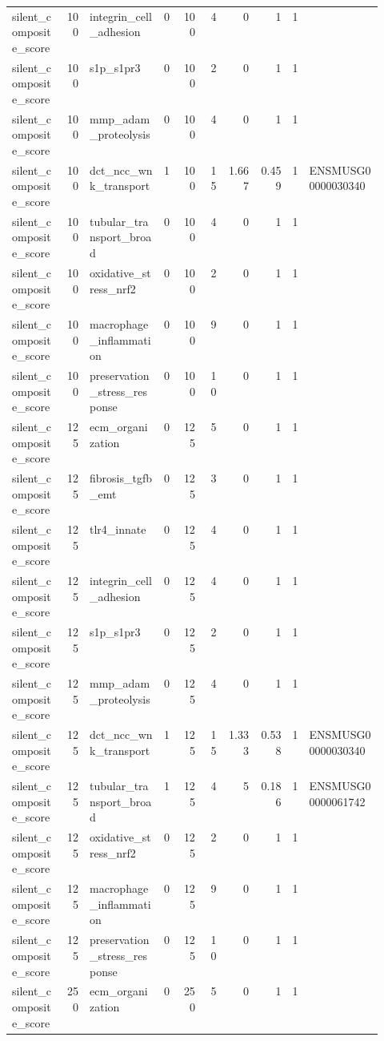 \documentclass[11pt]{article}
\begin{document}
\begin{landscape}
\begin{longtable}{p{0.14\linewidth}rp{0.20\linewidth}rrrrrrp{0.20\linewidth}}
silent\_composite\_score & 100 & integrin\_cell\_adhesion & 0 & 100 & 4 & 0 & 1 & 1 &  \\
silent\_composite\_score & 100 & s1p\_s1pr3 & 0 & 100 & 2 & 0 & 1 & 1 &  \\
silent\_composite\_score & 100 & mmp\_adam\_proteolysis & 0 & 100 & 4 & 0 & 1 & 1 &  \\
silent\_composite\_score & 100 & dct\_ncc\_wnk\_transport & 1 & 100 & 15 & 1.667 & 0.459 & 1 & ENSMUSG00000030340 \\
silent\_composite\_score & 100 & tubular\_transport\_broad & 0 & 100 & 4 & 0 & 1 & 1 &  \\
silent\_composite\_score & 100 & oxidative\_stress\_nrf2 & 0 & 100 & 2 & 0 & 1 & 1 &  \\
silent\_composite\_score & 100 & macrophage\_inflammation & 0 & 100 & 9 & 0 & 1 & 1 &  \\
silent\_composite\_score & 100 & preservation\_stress\_response & 0 & 100 & 10 & 0 & 1 & 1 &  \\
silent\_composite\_score & 125 & ecm\_organization & 0 & 125 & 5 & 0 & 1 & 1 &  \\
silent\_composite\_score & 125 & fibrosis\_tgfb\_emt & 0 & 125 & 3 & 0 & 1 & 1 &  \\
silent\_composite\_score & 125 & tlr4\_innate & 0 & 125 & 4 & 0 & 1 & 1 &  \\
silent\_composite\_score & 125 & integrin\_cell\_adhesion & 0 & 125 & 4 & 0 & 1 & 1 &  \\
silent\_composite\_score & 125 & s1p\_s1pr3 & 0 & 125 & 2 & 0 & 1 & 1 &  \\
silent\_composite\_score & 125 & mmp\_adam\_proteolysis & 0 & 125 & 4 & 0 & 1 & 1 &  \\
silent\_composite\_score & 125 & dct\_ncc\_wnk\_transport & 1 & 125 & 15 & 1.333 & 0.538 & 1 & ENSMUSG00000030340 \\
silent\_composite\_score & 125 & tubular\_transport\_broad & 1 & 125 & 4 & 5 & 0.186 & 1 & ENSMUSG00000061742 \\
silent\_composite\_score & 125 & oxidative\_stress\_nrf2 & 0 & 125 & 2 & 0 & 1 & 1 &  \\
silent\_composite\_score & 125 & macrophage\_inflammation & 0 & 125 & 9 & 0 & 1 & 1 &  \\
silent\_composite\_score & 125 & preservation\_stress\_response & 0 & 125 & 10 & 0 & 1 & 1 &  \\
silent\_composite\_score & 250 & ecm\_organization & 0 & 250 & 5 & 0 & 1 & 1 &  \\

\end{longtable}
\end{landscape}
\end{document}
